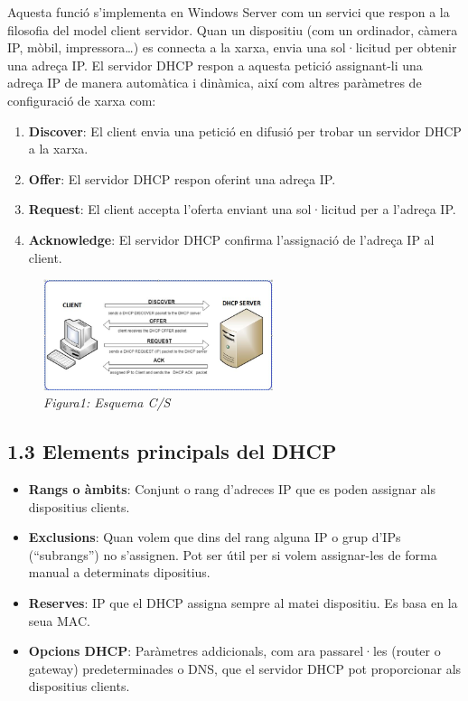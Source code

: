 \documentclass[
  a4paper,
]{article}
\providecommand{\tightlist}{%
  \setlength{\itemsep}{0pt}\setlength{\parskip}{0pt}}
\begin{document}
Aquesta funció s'implementa en Windows Server com un servici que respon
a la filosofia del model client servidor. Quan un dispositiu (com un
ordinador, càmera IP, mòbil, impressora\ldots) es connecta a la xarxa,
envia una sol·licitud per obtenir una adreça IP. El servidor DHCP respon
a aquesta petició assignant-li una adreça IP de manera automàtica i
dinàmica, així com altres paràmetres de configuració de xarxa com:

\begin{enumerate}
\def\labelenumi{\arabic{enumi}.}
\tightlist
\item
  \textbf{Discover}: El client envia una petició en difusió per trobar
  un servidor DHCP a la xarxa.
\item
  \textbf{Offer}: El servidor DHCP respon oferint una adreça IP.
\item
  \textbf{Request}: El client accepta l'oferta enviant una sol·licitud
  per a l'adreça IP.
\item
  \textbf{Acknowledge}: El servidor DHCP confirma l'assignació de
  l'adreça IP al client.
\end{enumerate}

\begin{figure}
\centering
\includegraphics[width=0.6\textwidth,height=\textheight]{png/DHCPesquema.jpg}
\caption{\emph{Figura1: Esquema C/S}}
\end{figure}

\subsection{1.3 Elements principals del
DHCP}\label{elements-principals-del-dhcp}

\begin{itemize}
\item
  \textbf{Rangs o àmbits}: Conjunt o rang d'adreces IP que es poden
  assignar als dispositius clients.
\item
  \textbf{Exclusions}: Quan volem que dins del rang alguna IP o grup
  d'IPs (``subrangs'') no s'assignen. Pot ser útil per si volem
  assignar-les de forma manual a determinats dipositius.
\item
  \textbf{Reserves}: IP que el DHCP assigna sempre al matei dispositiu.
  Es basa en la seua MAC.
\item
  \textbf{Opcions DHCP}: Paràmetres addicionals, com ara passarel·les
  (router o gateway) predeterminades o DNS, que el servidor DHCP pot
  proporcionar als dispositius clients.
\end{itemize}
\end{document}
